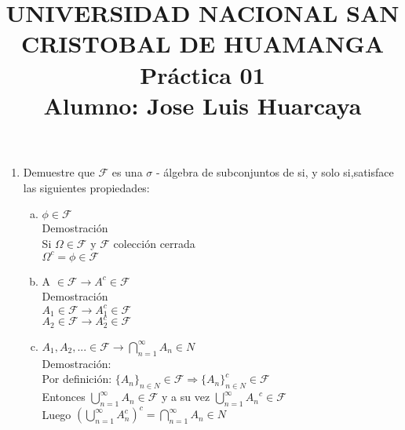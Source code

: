 \documentclass[12pt]{article}
\title{\textbf{
UNIVERSIDAD NACIONAL SAN CRISTOBAL DE HUAMANGA \\Práctica 01\\Alumno: Jose Luis Huarcaya}}
\date{}
\begin{document}
\maketitle
\begin{enumerate}
\item  Demuestre que $\mathcal{F}$ es una $\sigma$ - álgebra de subconjuntos de si, y solo si,satisface las siguientes propiedades:
\begin{enumerate}[a)]

\item $\phi \in \mathcal{F}$\\[0.2cm]
Demostración\\[0.2cm]
Si $\Omega \in \mathcal{F}$ y $ \mathcal{F}$ colección cerrada\\[0.2cm]
$\Omega^c = \phi\in\mathcal{F}$\\[0.2cm]

\item A $\in \mathcal{F}\longrightarrow A^{c} \in\mathcal{F}$\\[0.2cm]
Demostración\\[0.2cm]
$A_1\in \mathcal{F} \longrightarrow {A_1^c} \in \mathcal{F} $\\[0.2cm]
$A_2\in \mathcal{F} \longrightarrow {A_2^c} \in \mathcal{F} $\\[0.2cm]


\item $A_1,A_2,... \in \mathcal{F} \longrightarrow\displaystyle\bigcap_{n=1}^{\infty}{A_n \in N}$\\[0.2cm]
Demostración:\\[0.2cm]
Por definición: $\{A_n\}_{n \in N} \in \mathcal{F} \Rightarrow \{A_n\}^c_{n \in N}\in \mathcal{F}$\\[0.2cm]
Entonces $\displaystyle\bigcup_{n=1}^{\infty}{A_n}\in \mathcal{F}$ y a su vez $\displaystyle\bigcup_{n=1}^{\infty}{A_n}^c\in \mathcal{F}$\\[0.2cm]
Luego $\left(\displaystyle\bigcup_{n=1}^{\infty}{A_n^c}\right)^c = \displaystyle\bigcap_{n=1}^{\infty}{A_n \in N}$

\end{enumerate}


\end{enumerate}
\end{document}
